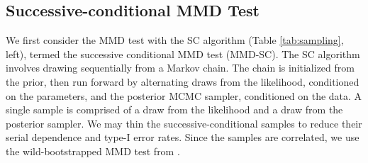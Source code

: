 \documentclass{article}
\newcommand{\tildepi}{\tilde{\pi}}
\begin{document}






\subsection{Successive-conditional MMD Test}
We first consider the MMD test with the SC algorithm (Table \ref{tab:sampling}, left), termed the successive conditional MMD test (MMD-SC).  
The SC algorithm involves drawing sequentially from a Markov chain. The chain is initialized from the prior, then run forward by alternating draws from the likelihood, conditioned on the parameters, and the posterior MCMC sampler, conditioned on the data. 
A single sample is comprised of a draw from the likelihood and a draw from the posterior sampler.
We may thin the successive-conditional samples to reduce their serial dependence and type-I error rates. 
Since the samples are correlated, we use the wild-bootstrapped MMD test from \cite{chwialkowski_wild_2014}. 
\end{document}
